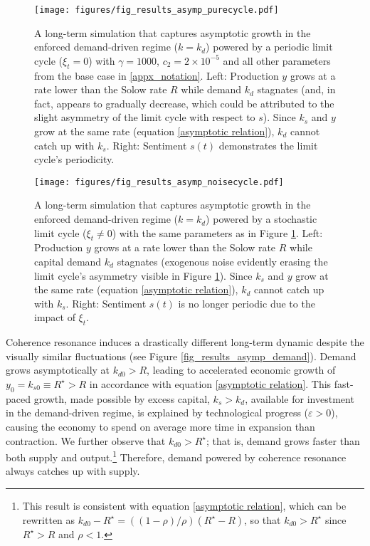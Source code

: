 \documentclass[authoryear, review]{elsarticle}
\begin{document}
\begin{figure}[htb]
    \centering
    \texttt{[image: figures/fig\_results\_asymp\_purecycle.pdf]}
    \caption{A long-term simulation that captures asymptotic growth in the enforced demand-driven regime ($k=k_d$) powered by a periodic limit cycle ($\xi_t=0$) with $\gamma=1000$, $c_2=2\times10^{-5}$ and all other parameters from the base case in \ref{appx_notation}. Left: Production $y$ grows at a rate lower than the Solow rate $R$ while demand $k_d$ stagnates (and, in fact, appears to gradually decrease, which could be attributed to the slight asymmetry of the limit cycle with respect to $s$). Since $k_s$ and $y$ grow at the same rate (equation \eqref{asymptotic relation}), $k_d$ cannot catch up with $k_s$. Right: Sentiment $s(t)$ demonstrates the limit cycle's periodicity.}
    \label{fig_results_asymp_purecycle}
\end{figure}
\begin{figure}[htb]
    \centering
    \texttt{[image: figures/fig\_results\_asymp\_noisecycle.pdf]}
    \caption{A long-term simulation that captures asymptotic growth in the enforced demand-driven regime ($k=k_d$) powered by a stochastic limit cycle ($\xi_t\neq0$) with the same parameters as in Figure \ref{fig_results_asymp_purecycle}. Left: Production $y$ grows at a rate lower than the Solow rate $R$ while capital demand $k_d$ stagnates (exogenous noise evidently erasing the limit cycle's asymmetry visible in Figure \ref{fig_results_asymp_purecycle}). Since $k_s$ and $y$ grow at the same rate (equation \eqref{asymptotic relation}), $k_d$ cannot catch up with $k_s$. Right: Sentiment $s(t)$ is no longer periodic due to the impact of $\xi_t$.}
    \label{fig_results_asymp_noisecycle}
\end{figure}

Coherence resonance induces a drastically different long-term dynamic despite the visually similar fluctuations (see Figure \ref{fig_results_asymp_demand}). Demand grows asymptotically at $k_{d0}>R$, leading to accelerated economic growth of $y_0=k_{s0} \equiv R^\star>R$ in accordance with equation \eqref{asymptotic relation}. This fast-paced growth, made possible by excess capital, $k_s>k_d$, available for investment in the demand-driven regime, is explained by technological progress ($\varepsilon>0$), causing the economy to spend on average more time in expansion than contraction. We further observe that $k_{d0}>R^\star$; that is, demand grows faster than both supply and output.\footnote{This result is consistent with equation \eqref{asymptotic relation}, which can be rewritten as $k_{d0}-R^\star=((1-\rho)/\rho)(R^\star-R)$, so that $k_{d0}>R^\star$ since $R^\star>R$ and $\rho<1$.} Therefore, demand powered by coherence resonance always catches up with supply.
\end{document}
